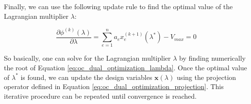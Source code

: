 Finally, we can use the following update rule to find the optimal value of the Lagrangian multiplier $\lambda$:

\begin{equation}
    \frac{\partial \phi^{(k)}(\lambda)}{\partial \lambda} = \sum_{e=1}^{n} a_e x_e^{(k+1)}(\lambda^*) - V_{max} = 0
    \label{eq:oc_dual_optimization_lambda}
\end{equation}

So basically, one can solve for the Lagrangian multiplier $\lambda$ by finding numerically the root of Equation \ref{eq:oc_dual_optimization_lambda}.
Once the optimal value of $\lambda^*$ is found, we can update the design variables $\bm{x}(\lambda)$ using the projection operator defined in Equation \ref{eq:oc_dual_optimization_projection}.
This iterative procedure can be repeated until convergence is reached.